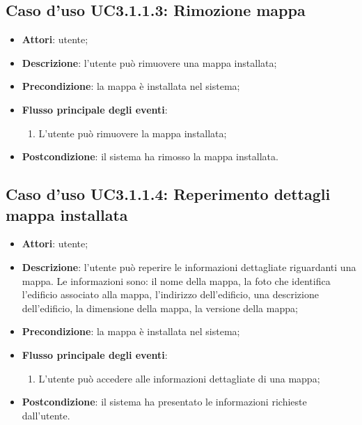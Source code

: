 \documentclass[../AnalisiDeiRequisiti.tex]{subfiles}
\begin{document}
\subsection{Caso d'uso UC3.1.1.3: Rimozione mappa}
\begin{itemize}
\item \textbf{Attori}: utente;
\item \textbf{Descrizione}: l'utente può rimuovere una mappa installata; 
      \item \textbf{Precondizione}: la mappa è installata nel sistema;

        \item \textbf{Flusso principale degli eventi}:
          \begin{enumerate}
          \item L'utente può rimuovere la mappa installata;

      \end{enumerate}
    \item \textbf{Postcondizione}: il sistema ha rimosso la mappa installata.
  \end{itemize}
\hypertarget{UC3.1.1.4}{}
\subsection{Caso d'uso UC3.1.1.4: Reperimento dettagli mappa installata}
\begin{itemize}
\item \textbf{Attori}: utente;
\item \textbf{Descrizione}: l'utente può reperire le informazioni dettagliate riguardanti una mappa. Le informazioni sono: il nome della mappa, la foto che identifica l'edificio associato alla mappa, l'indirizzo dell'edificio, una descrizione dell'edificio, la dimensione della mappa, la versione della mappa; 
      \item \textbf{Precondizione}: la mappa è installata nel sistema;

        \item \textbf{Flusso principale degli eventi}:
          \begin{enumerate}
          \item L'utente può accedere alle informazioni dettagliate di una mappa;

      \end{enumerate}
    \item \textbf{Postcondizione}: il sistema ha presentato le informazioni richieste dall'utente.
  \end{itemize}
\hypertarget{UC3.1.2}{}
\end{document}
